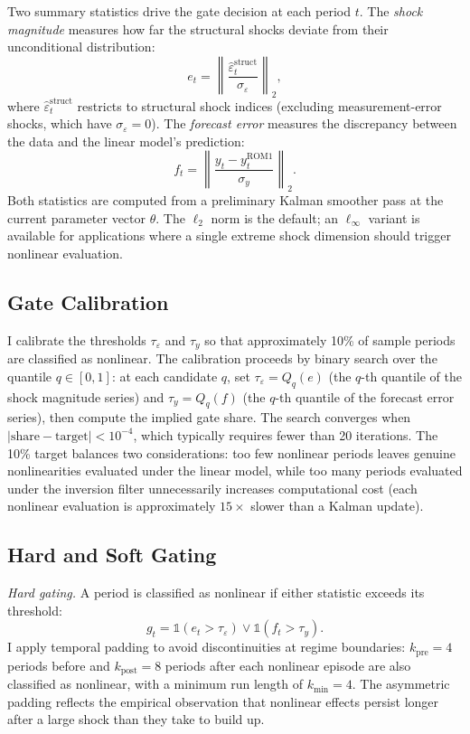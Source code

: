 \documentclass[12pt]{article}
\theoremstyle{plain}
\theoremstyle{definition}
\theoremstyle{remark}
\newcommand{\ind}{\mathbb{1}}
\begin{document}
Two summary statistics drive the gate decision at each period $t$. The \textit{shock magnitude} measures how far the structural shocks deviate from their unconditional distribution:
\begin{equation}
e_t = \left\| \frac{\hat{\varepsilon}_t^{\text{struct}}}{\sigma_\varepsilon} \right\|_2,
\end{equation}
where $\hat{\varepsilon}_t^{\text{struct}}$ restricts to structural shock indices (excluding measurement-error shocks, which have $\sigma_\varepsilon = 0$). The \textit{forecast error} measures the discrepancy between the data and the linear model's prediction:
\begin{equation}
f_t = \left\| \frac{y_t - y_t^{\text{ROM1}}}{\sigma_y} \right\|_2.
\end{equation}
Both statistics are computed from a preliminary Kalman smoother pass at the current parameter vector $\theta$. The $\ell_2$ norm is the default; an $\ell_\infty$ variant is available for applications where a single extreme shock dimension should trigger nonlinear evaluation.


\subsection{Gate Calibration}
\label{app:gate_calibration}

I calibrate the thresholds $\tau_\varepsilon$ and $\tau_y$ so that approximately 10\% of sample periods are classified as nonlinear. The calibration proceeds by binary search over the quantile $q \in [0, 1]$: at each candidate $q$, set $\tau_\varepsilon = Q_q(e)$ (the $q$-th quantile of the shock magnitude series) and $\tau_y = Q_q(f)$ (the $q$-th quantile of the forecast error series), then compute the implied gate share. The search converges when $|\text{share} - \text{target}| < 10^{-4}$, which typically requires fewer than 20 iterations. The 10\% target balances two considerations: too few nonlinear periods leaves genuine nonlinearities evaluated under the linear model, while too many periods evaluated under the inversion filter unnecessarily increases computational cost (each nonlinear evaluation is approximately $15\times$ slower than a Kalman update).


\subsection{Hard and Soft Gating}

\textit{Hard gating.} A period is classified as nonlinear if either statistic exceeds its threshold:
\begin{equation}
g_t = \ind(e_t > \tau_\varepsilon) \lor \ind(f_t > \tau_y).
\end{equation}
I apply temporal padding to avoid discontinuities at regime boundaries: $k_{\text{pre}} = 4$ periods before and $k_{\text{post}} = 8$ periods after each nonlinear episode are also classified as nonlinear, with a minimum run length of $k_{\text{min}} = 4$. The asymmetric padding reflects the empirical observation that nonlinear effects persist longer after a large shock than they take to build up.
\end{document}
